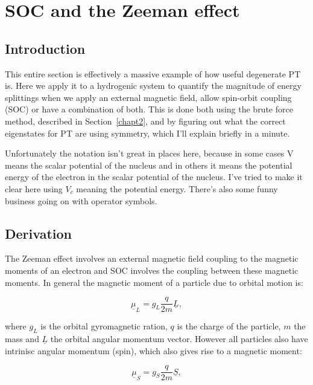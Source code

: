 \chapter{SOC and the Zeeman effect}
\label{chapt4}

\section{Introduction}

This entire section is effectively a massive example of how useful degenerate PT is. Here we apply it to a hydrogenic system to quantify the magnitude of energy splittings when we apply an external magnetic field, allow spin-orbit coupling (SOC) or have a combination of both. This is done both using the brute force method, described in Section~\ref{chapt2}, and by figuring out what the correct eigenstates for PT are using symmetry, which I'll explain briefly in a minute.

\noindent Unfortunately the notation isn't great in places here, because in some cases V means the scalar potential of the nucleus and in others it means the potential energy of the electron in the scalar potential of the nucleus. I've tried to make it clear here using $V_c$ meaning the potential energy. There's also some funny business going on with operator symbols.

\section{Derivation}

The Zeeman effect involves an external magnetic field coupling to the magnetic moments of an electron and SOC involves the coupling between these magnetic moments. In general the magnetic moment of a particle due to orbital motion is:

\begin{equation}
    \boxed{\underline{\mu}_L = g_L \frac{q}{2m} \underline{L}},
    \label{OrbitalMagneticMoment}
\end{equation}

\noindent where $g_L$ is the orbital gyromagnetic ration, $q$ is the charge of the particle, $m$ the mass and $\underline{L}$ the orbital angular momentum vector. However all particles also have intrinisc angular momentum (spin), which also gives rise to a magnetic moment:

\begin{equation}
    \boxed{\underline{\mu}_S = g_S \frac{q}{2m} \underline{S}},
    \label{SpinMagneticMoment}
\end{equation}

